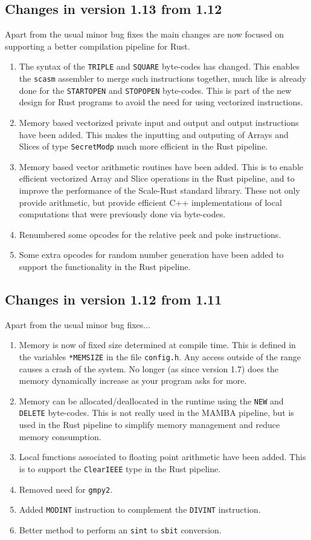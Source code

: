 \subsection{Changes in version 1.13 from 1.12}
Apart from the usual minor bug fixes the main changes
are now focused on supporting a better compilation pipeline
for Rust.
\begin{enumerate}
\item The syntax of the \verb|TRIPLE| and \verb|SQUARE| byte-codes
has changed. This enables the \verb|scasm| assembler to merge
such instructions together, much like is already done for the
\verb|STARTOPEN| and \verb|STOPOPEN| byte-codes. This is part
of the new design for Rust programs to avoid the need for
using vectorized instructions.
\item Memory based vectorized private input and output and output
instructions have been added. This makes the inputting
and outputing of Arrays and Slices of type \verb|SecretModp| much more
efficient in the Rust pipeline.
\item Memory based vector arithmetic routines have been added. This is 
to enable efficient vectorized Array and Slice operations in the Rust pipeline,
and to improve the performance of the Scale-Rust standard library.
These not only provide arithmetic, but provide efficient C++ implementations
of local computations that were previously done via byte-codes.
\item Renumbered some opcodes for the relative peek and poke instructions.
\item Some extra opcodes for random number generation have been added to support the functionality in the Rust pipeline.
\end{enumerate}



\subsection{Changes in version 1.12 from 1.11}
Apart from the usual minor bug fixes...
\begin{enumerate}
\item Memory is now of fixed size determined at compile time.
This is defined in the variables \verb|*MEMSIZE| in the file
\verb|config.h|. Any access outside of the range causes a crash
of the system. No longer (as since version 1.7)
does the memory dynamically increase as your
program asks for more.
\item Memory can be allocated/deallocated in the runtime
	using the \verb|NEW| and \verb|DELETE| byte-codes.
	This is not really used in the MAMBA pipeline, but
	is used in the Rust pipeline to simplify memory
	management and reduce memory consumption.
\item Local functions associated to floating point arithmetic
	have been added. This is to support the 
	\verb|ClearIEEE| type in the Rust pipeline.
\item Removed need for \verb|gmpy2|.
\item Added \verb|MODINT| instruction to complement the
	\verb|DIVINT| instruction.
\item Better method to perform an \verb|sint| to \verb|sbit| conversion.
\end{enumerate}


